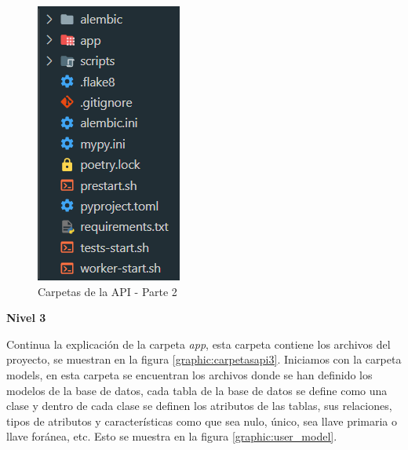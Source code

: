 \begin{figure}[!htb]
    \centering
    \includegraphics[scale=1]{TT/img/implementacion/carpeta-api-2.png}
    \caption{Carpetas de la API - Parte 2}
    \label{graphic:carpetasapi2}    
\end{figure}

\textbf{Nivel 3}

Continua la explicación de la carpeta \textit{app}, esta carpeta contiene los archivos del proyecto, se muestran en la figura \ref{graphic:carpetasapi3}. Iniciamos con la carpeta models, en esta carpeta se encuentran los archivos donde se han definido los modelos de la base de datos, cada tabla de la base de datos se define como una clase y dentro de cada clase se definen los atributos de las tablas, sus relaciones, tipos de atributos y características como que sea nulo, único, sea llave primaria o llave foránea, etc. Esto se muestra en la figura \ref{graphic:user_model}.

